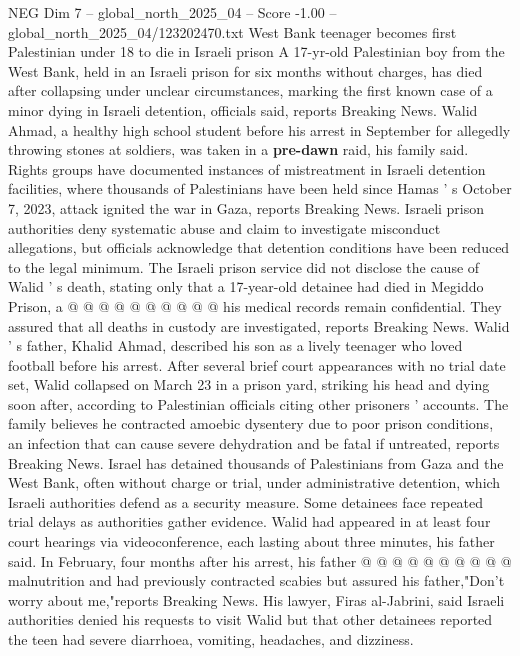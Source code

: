 \begin{textsample}{NEG Dim 7 – global\_north\_2025\_04 – Score -1.00 – global\_north\_2025\_04/123202470.txt}  \label{ex:f7_neg_093}
West Bank teenager becomes first Palestinian under 18 to die in Israeli prison A 17-yr-old Palestinian boy from the West Bank, held in an Israeli prison for six months without charges, has died after collapsing under unclear circumstances, marking the first known case of a minor dying in Israeli detention, officials said, reports Breaking News.
Walid Ahmad, a healthy high school student before his arrest in September for allegedly throwing stones at soldiers, was taken in a \textbf{pre-dawn} raid, his family said.
Rights groups have documented instances of mistreatment in Israeli detention facilities, where thousands of Palestinians have been held since Hamas ' s October 7, 2023, attack ignited the war in Gaza, reports Breaking News.
Israeli prison authorities deny systematic abuse and claim to investigate misconduct allegations, but officials acknowledge that detention conditions have been reduced to the legal minimum.
The Israeli prison service did not disclose the cause of Walid ' s death, stating only that a 17-year-old detainee had died in Megiddo Prison, a @ @ @ @ @ @ @ @ @ @ his medical records remain confidential.
They assured that all deaths in custody are investigated, reports Breaking News.
Walid ' s father, Khalid Ahmad, described his son as a lively teenager who loved football before his arrest.
After several brief court appearances with no trial date set, Walid collapsed on March 23 in a prison yard, striking his head and dying soon after, according to Palestinian officials citing other prisoners ' accounts.
The family believes he contracted amoebic dysentery due to poor prison conditions, an infection that can cause severe dehydration and be fatal if untreated, reports Breaking News.
Israel has detained thousands of Palestinians from Gaza and the West Bank, often without charge or trial, under administrative detention, which Israeli authorities defend as a security measure.
Some detainees face repeated trial delays as authorities gather evidence.
Walid had appeared in at least four court hearings via videoconference, each lasting about three minutes, his father said.
In February, four months after his arrest, his father @ @ @ @ @ @ @ @ @ @ malnutrition and had previously contracted scabies but assured his father,"Don't worry about me,"reports Breaking News.
His lawyer, Firas al-Jabrini, said Israeli authorities denied his requests to visit Walid but that other detainees reported the teen had severe diarrhoea, vomiting, headaches, and dizziness.

\end{textsample}
